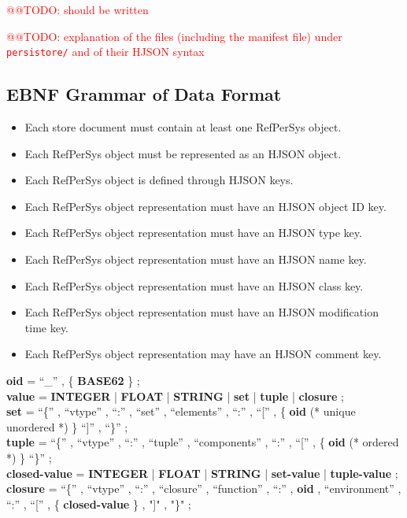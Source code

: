 \documentclass[11pt,a4paper,svgnames]{article}
\begin{document}
\textcolor{red}{@@TODO: should be written}

\textcolor{red}{@@TODO: explanation of the files (including the
  manifest file) under \texttt{persistore/} and of their HJSON syntax}


\subsection{EBNF Grammar of Data Format}
\label{subsec:data-format-ebnf}

\begin{itemize}
  \item Each store document must contain at least one RefPerSys object.
  \item Each RefPerSys object must be represented as an HJSON object.
  \item Each RefPerSys object is defined through HJSON keys.
  \item Each RefPerSys object representation must have an HJSON object ID key.
  \item Each RefPerSys object representation must have an HJSON type key.
  \item Each RefPerSys object representation must have an HJSON  name key.
  \item Each RefPerSys object representation must have an HJSON class key.
  \item Each RefPerSys object representation must have an HJSON modification time key.
  \item Each RefPerSys object representation may have an HJSON comment key.
\end{itemize}

\textbf{oid} = ``\_'' , \{ \textbf{BASE62} \} ; \\
\textbf{value} = \textbf{INTEGER} | \textbf{FLOAT} | \textbf{STRING} 
	       | \textbf{set} | \textbf{tuple}  | \textbf{closure} ; \\
\textbf{set} = ``\{'' , ``vtype'' , ``:'' , ``set'' , 
             ``elements'' , ``:'' , 
	     ``['' , \{ \textbf{oid} (* unique unordered *) \} 
	     ``]'' ,  ``\}'' ; \\
\textbf{tuple} = ``\{'' , ``vtype'' , ``:'' , ``tuple'' , 
                   ``components'' , ``:'' ,  ``['' , \{ \textbf{oid} (* ordered *) \} 
		   ``\}'' ; \\
\textbf{closed-value} = \textbf{INTEGER} | \textbf{FLOAT} | \textbf{STRING}
                      | \textbf{set-value} | \textbf{tuple-value} ; \\
\textbf{closure} = ``\{'' , ``vtype'' , ``:'' , ``closure'' , 
	         ``function'' , ``:'' , \textbf{oid} , 
		 ``environment'' , ``:'' , ``['' , \{ \textbf{closed-value} \} , "]" , "\}" ;

\clearpage
\printnoidxglossaries
\bigskip
\printbibliography
\bigskip
\printindex
\end{document}
